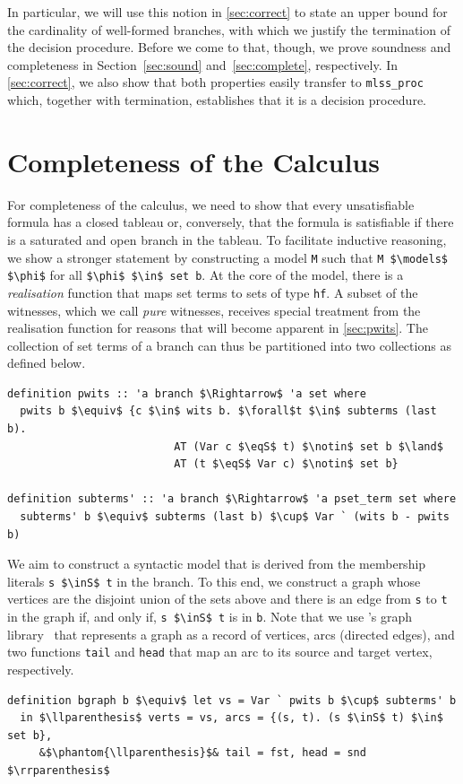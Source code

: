 \documentclass[runningheads]{llncs}
\newcommand{\inS}{\in_\text{s}}
\newcommand{\eqS}{=_\text{s}}
\begin{document}
In particular, we will use this notion in \autoref{sec:correct} to state an upper bound for the cardinality of well-formed branches, with which we justify the termination of the decision procedure. 
Before we come to that, though, we prove soundness and completeness in Section~\ref{sec:sound} and~\ref{sec:complete}, respectively.
In \autoref{sec:correct}, we also show that both properties easily transfer to \lstinline!mlss_proc! which, together with termination, establishes that it is a decision procedure.

\section{Completeness of the Calculus\label{sec:complete}}
For completeness of the calculus, we need to show that every unsatisfiable formula has a closed tableau or, conversely, that the formula is satisfiable if there is a saturated and open branch in the tableau.
To facilitate inductive reasoning, we show a stronger statement by constructing a model \lstinline!M! such that \lstinline!M $\models$ $\phi$! for all \lstinline!$\phi$ $\in$ set b!.
At the core of the model, there is a \textit{realisation} function that maps set terms to sets of type \lstinline!hf!.
A subset of the witnesses, which we call \textit{pure} witnesses, receives special treatment from the realisation function for reasons that will become apparent in \autoref{sec:pwits}.
The collection of set terms of a branch can thus be partitioned into two collections as defined below.
\begin{lstlisting}
definition pwits :: 'a branch $\Rightarrow$ 'a set where
  pwits b $\equiv$ {c $\in$ wits b. $\forall$t $\in$ subterms (last b).
                          AT (Var c $\eqS$ t) $\notin$ set b $\land$
                          AT (t $\eqS$ Var c) $\notin$ set b} 

definition subterms' :: 'a branch $\Rightarrow$ 'a pset_term set where
  subterms' b $\equiv$ subterms (last b) $\cup$ Var ` (wits b - pwits b)
\end{lstlisting}

We aim to construct a syntactic model that is derived from the membership literals \lstinline!s $\inS$ t! in the branch.
To this end, we construct a graph whose vertices are the disjoint union of the sets above and there is an edge from \lstinline!s! to \lstinline!t! in the graph if, and only if, \lstinline!s $\inS$ t! is in \lstinline!b!.
Note that we use \citeauthor{graph_theory_afp}'s graph library~\cite{graph_theory_afp} that represents a graph as a record of vertices, arcs (directed edges), and two functions \lstinline!tail! and \lstinline!head! that map an arc to its source and target vertex, respectively.
\begin{lstlisting}
definition bgraph b $\equiv$ let vs = Var ` pwits b $\cup$ subterms' b
  in $\llparenthesis$ verts = vs, arcs = {(s, t). (s $\inS$ t) $\in$ set b},
     &$\phantom{\llparenthesis}$& tail = fst, head = snd $\rrparenthesis$
\end{lstlisting}
\end{document}
